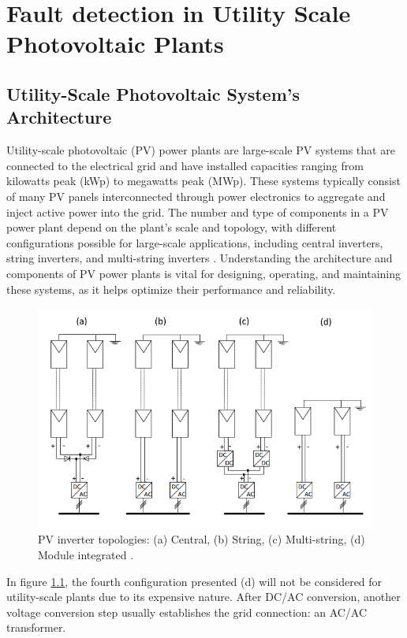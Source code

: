 \chapter{Fault detection in Utility Scale Photovoltaic Plants}


\section{Utility-Scale Photovoltaic System's Architecture}

Utility-scale photovoltaic (PV) power plants are large-scale PV systems that are connected to the electrical grid and have installed capacities ranging from kilowatts peak (kWp) to megawatts peak (MWp). These systems typically consist of many PV panels interconnected through power electronics to aggregate and inject active power into the grid. The number and type of components in a PV power plant depend on the plant's scale and topology, with different configurations possible for large-scale applications, including central inverters, string inverters, and multi-string inverters \cite{lspv}. Understanding the architecture and components of PV power plants is vital for designing, operating, and maintaining these systems, as it helps optimize their performance and reliability.

\begin{figure}[h]
    \centering
    \includegraphics[width=12cm]{figures/topologies.png}
    \caption{PV inverter topologies:  (a) Central, (b) String, (c) Multi-string,
    (d) Module integrated \cite{lspv}.}
    \label{topologies}
\end{figure}

In figure \ref{topologies}, the fourth configuration presented (d) will not be considered for utility-scale plants due to its expensive nature. After DC/AC conversion, another voltage conversion step usually establishes the grid connection: an AC/AC transformer.

